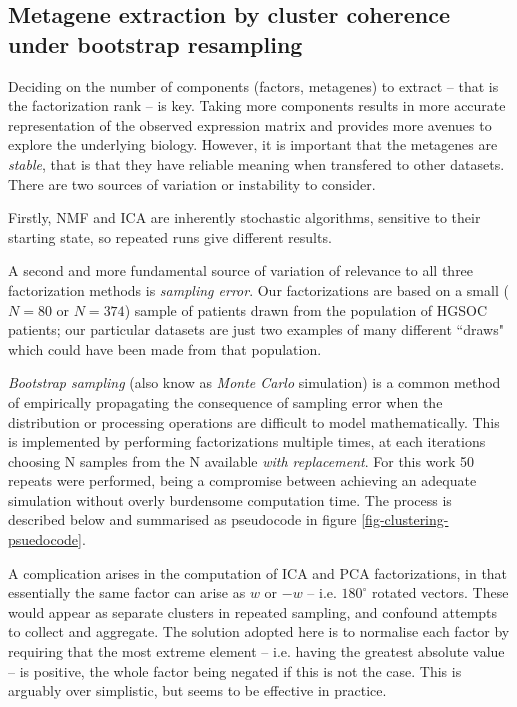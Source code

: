 \documentclass[tikz, 12pt,a4paper,oneside,fleqn]{article}
\begin{document}
\subsection{Metagene extraction by cluster coherence under bootstrap resampling}
\label{sec-metagene-selection}
Deciding on the number of components (factors, metagenes) to extract -- that is the factorization rank -- is key.  Taking more components results in more accurate representation of the observed expression matrix and provides more avenues to explore the underlying biology.  However, it is important that the metagenes are \emph{stable}, that is that they have reliable meaning when transfered to other datasets.   There are two sources of variation or instability to consider.

Firstly, NMF and ICA are inherently stochastic algorithms, sensitive to their starting state, so repeated runs give different results.

A second and more fundamental source of variation of relevance to all three factorization methods is \emph{sampling error}.   Our factorizations are based on a small ($N=80$ or $N=374$) sample of patients drawn from the population of HGSOC patients; our particular datasets are just two examples of many different ``draws" which could have been made from that population.

\emph{Bootstrap sampling} (also know as \emph{Monte Carlo} simulation) is a common method of empirically propagating the consequence of sampling error when the distribution or processing operations are difficult to model mathematically.   This is implemented by performing factorizations multiple times, at each iterations choosing N samples from the N available \emph{with replacement}.   For this work 50 repeats were performed, being a compromise between achieving an adequate simulation without overly burdensome computation time.  The process is described below and summarised as pseudocode in figure \ref{fig-clustering-psuedocode}.  

A complication arises in the computation of ICA and PCA factorizations, in that essentially the same factor can arise as $w$ or $-w$ -- i.e. $180^\circ$ rotated vectors. These would appear as separate clusters in repeated sampling, and confound attempts to collect and aggregate.  The solution adopted here is to normalise each factor by requiring that the most extreme element -- i.e. having the greatest absolute value -- is positive, the whole factor being negated if this is not the case.  This is arguably over simplistic, but seems to be effective in practice.
\end{document}

